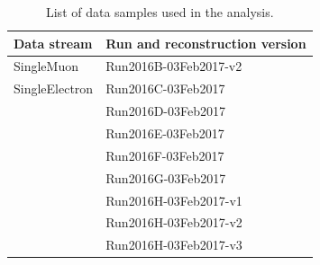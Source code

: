 \begin{table}[!htbp]
  \begin{center}
  \begin{tabular}{l l}
\hline \textbf{Data stream} &  \textbf{Run and reconstruction version}  \\
\hline
SingleMuon      &       Run2016B-03Feb2017-v2       \\
SingleElectron  &       Run2016C-03Feb2017           \\
                &       Run2016D-03Feb2017           \\
		            &       Run2016E-03Feb2017          \\
                &       Run2016F-03Feb2017           \\
		            &       Run2016G-03Feb2017          \\
                &       Run2016H-03Feb2017-v1       \\
		            &       Run2016H-03Feb2017-v2       \\
                &       Run2016H-03Feb2017-v3       \\
\hline
  \end{tabular}
  \caption{List of data samples used in the analysis.}
  \label{tab:datasample}
  \end{center}
\end{table}
 
 
